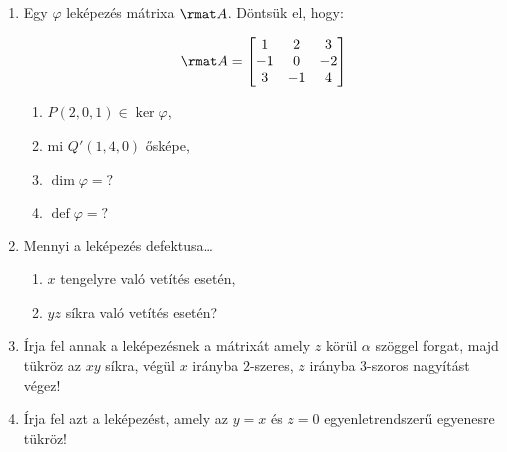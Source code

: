 \documentclass[a4paper, 12pt]{scrartcl}
\begin{document}
\begin{enumerate}
  \item Egy $\varphi$ leképezés mátrixa $\rmat A$. Döntsük el, hogy:\\[-2mm]
        \begin{minipage}[b]{.25\textwidth}
          $$
            \rmat A = \begin{bmatrix}
              1  & 2  & 3  \\
              -1 & 0  & -2 \\
              3  & -1 & 4  \\
            \end{bmatrix}
          $$
        \end{minipage}\hfill
        \begin{minipage}[c]{.35\textwidth}
          \begin{enumerate}
            \item $P(2,0,1) \in \ker \varphi$,
            \item mi $Q'(1,4,0)$ ősképe,
          \end{enumerate}
        \end{minipage}
        \begin{minipage}[c]{.3\textwidth}
          \begin{enumerate}
            \setcounter{enumii}{2}
            \item $\dim \varphi = ?$
            \item $\operatorname{def} \varphi = ?$
          \end{enumerate}
        \end{minipage}

  \item Mennyi a leképezés defektusa\dots
        \begin{multicols}{2}
          \begin{enumerate}
            \item $x$ tengelyre való vetítés esetén,
            \item $yz$ síkra való vetítés esetén?
          \end{enumerate}
        \end{multicols}

  \item Írja fel annak a leképezésnek a mátrixát amely $z$ körül $\alpha$
        szöggel forgat, majd tükröz az $xy$ síkra, végül $x$ irányba $2$-szeres,
        $z$ irányba $3$-szoros nagyítást végez!

  \item Írja fel azt a leképezést, amely az $y=x$ és $z=0$ egyenletrendszerű
        egyenesre tükröz!


\end{enumerate}
\end{document}

